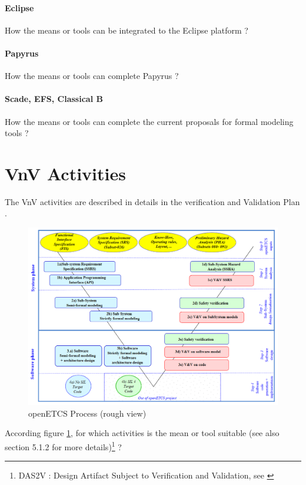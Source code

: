\paragraph{Eclipse}
How the means or tools can be integrated to the Eclipse platform ?

\paragraph{Papyrus}
How the means or tools can complete  Papyrus ?


\paragraph{Scade, EFS, Classical B}
How the means or tools can complete the current proposals for formal modeling tools ?





\section{VnV Activities}

The VnV activities are described in details in the verification and Validation Plan  \citep{D4.1}.

\begin{figure}[htb]
  \centering
  \includegraphics[width=.9\textwidth]{images/ProcessOpenETCS-BeM.png}
  \caption{openETCS Process (rough view)}
  \label{fig:openETCSProcess}
\end{figure}

According figure \ref{fig:openETCSProcess}, for which activities is the mean or tool suitable (see also \citep{D4.1} section 5.1.2 for more details)\footnote{DAS2V : Design Artifact Subject to Verification and Validation, see \citep{D4.1}} ?


